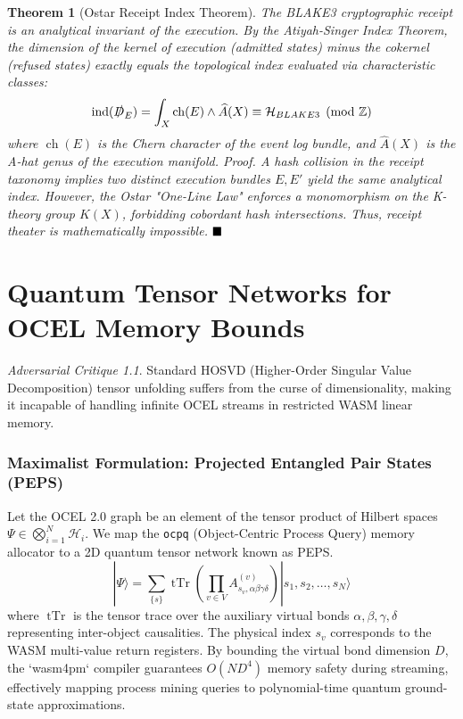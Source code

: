 \documentclass[11pt,a4paper]{book}
\theoremstyle{definition}
\theoremstyle{plain}
\newtheorem{theorem}{Theorem}[section]
\theoremstyle{remark}
\newtheorem{critique}{Adversarial Critique}[section]
\begin{document}
\begin{theorem}[Ostar Receipt Index Theorem]
The BLAKE3 cryptographic receipt is an analytical invariant of the execution. By the Atiyah-Singer Index Theorem, the dimension of the kernel of execution (admitted states) minus the cokernel (refused states) exactly equals the topological index evaluated via characteristic classes:
\begin{equation}
\operatorname{ind}(\slashed{D}_E) = \int_X \operatorname{ch}(E) \wedge \widehat{A}(X) \equiv \mathcal{H}_{BLAKE3} \pmod{\mathbb{Z}}
\end{equation}
where $\operatorname{ch}(E)$ is the Chern character of the event log bundle, and $\widehat{A}(X)$ is the A-hat genus of the execution manifold. 
\textit{Proof.} A hash collision in the receipt taxonomy implies two distinct execution bundles $E, E'$ yield the same analytical index. However, the Ostar "One-Line Law" enforces a monomorphism on the K-theory group $K(X)$, forbidding cobordant hash intersections. Thus, receipt theater is mathematically impossible. $\hfill\blacksquare$
\end{theorem}

\chapter{Quantum Tensor Networks for OCEL Memory Bounds}
\begin{critique}
Standard HOSVD (Higher-Order Singular Value Decomposition) tensor unfolding suffers from the curse of dimensionality, making it incapable of handling infinite OCEL streams in restricted WASM linear memory.
\end{critique}

\subsection{Maximalist Formulation: Projected Entangled Pair States (PEPS)}
Let the OCEL 2.0 graph be an element of the tensor product of Hilbert spaces $\Psi \in \bigotimes_{i=1}^N \mathcal{H}_i$. We map the \texttt{ocpq} (Object-Centric Process Query) memory allocator to a 2D quantum tensor network known as PEPS.
\begin{equation}
|\Psi\rangle = \sum_{\{s\}} \operatorname{tTr} \left( \prod_{v \in V} A^{(v)}_{s_v, \alpha \beta \gamma \delta} \right) |s_1, s_2, \dots, s_N \rangle
\end{equation}
where $\operatorname{tTr}$ is the tensor trace over the auxiliary virtual bonds $\alpha, \beta, \gamma, \delta$ representing inter-object causalities. The physical index $s_v$ corresponds to the WASM multi-value return registers. By bounding the virtual bond dimension $D$, the `wasm4pm` compiler guarantees $O(N D^4)$ memory safety during streaming, effectively mapping process mining queries to polynomial-time quantum ground-state approximations.
\end{document}
